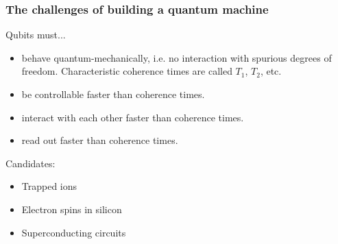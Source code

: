 \begin{frame}
\frametitle{The challenges of building a quantum machine}
Qubits must...
\begin{itemize}
  \item behave quantum-mechanically, i.e. no interaction with spurious degrees of freedom. Characteristic coherence times are called $T_1$, $T_2$, etc.
  \item be controllable faster than coherence times.
  \item interact with each other faster than coherence times.
  \item read out faster than coherence times.
\end{itemize}

Candidates:
\begin{itemize}
  \item Trapped ions
  \item Electron spins in silicon
  \item Superconducting circuits
\end{itemize}
\end{frame}
